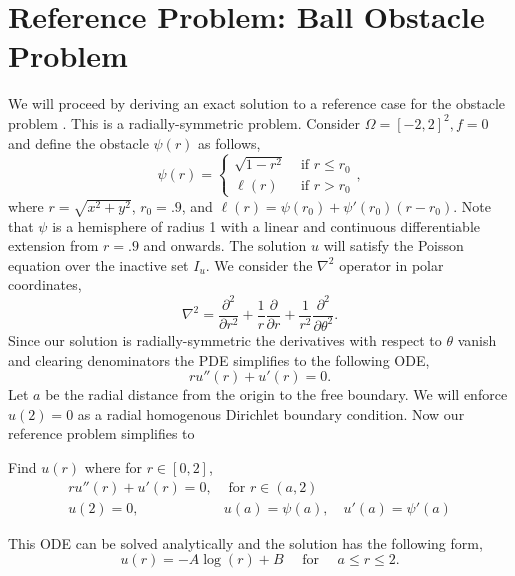 \documentclass[12 pt]{report}
\begin{document}
\section{Reference Problem: Ball Obstacle Problem}
We will proceed by deriving an exact solution to a reference case for the obstacle problem \citep[Chapter 12]{bueler_petsc_2021}. This is a radially-symmetric problem. Consider $\Omega = [-2, 2]^2, f = 0$ and define the obstacle $\psi(r)$ as follows, 
\begin{equation}
  \psi(r) = \begin{cases}
    \sqrt{1 - r^2} & \text{ if } r \leq r_0\\
    \ell(r) & \text{ if } r > r_0
  \end{cases},
\end{equation}
where $r = \sqrt{x^2 + y^2}$, $r_0 = .9$, and $\ell(r) = \psi(r_0) + \psi'(r_0)(r - r_0)$. Note that $\psi$ is a hemisphere of radius 1 with a linear and continuous differentiable extension from $r = .9$ and onwards. The solution $u$ will satisfy the Poisson equation over the inactive set $I_u$. We consider the $\nabla^2$ operator in polar coordinates, 
\begin{equation}
  \nabla^2 = \frac{\partial^2 }{\partial r^2} + \frac{1}{r}\frac{\partial }{\partial r} + \frac{1}{r^2}\frac{\partial^2 }{\partial \theta^2}.
\end{equation}
Since our solution is radially-symmetric the derivatives with respect to $\theta$ vanish and clearing denominators the PDE simplifies to the following ODE, 
\begin{equation}
  ru''(r) + u'(r) = 0.
\end{equation}
Let $a$ be the radial distance from the origin to the free boundary. We will enforce $u(2) = 0$ as a radial homogenous Dirichlet boundary condition. Now our reference problem simplifies to
\begin{mdframed}
  Find $u(r)$ where for $r \in [0, 2]$,
  \begin{align}  \label{eq:Sphere Obstacle}
    ru''(r) + u'(r) = 0, &\text{ for } r \in (a, 2)\\
    u(2) = 0, \quad  &u(a) = \psi(a), \quad u'(a) = \psi'(a)
  \end{align}
\end{mdframed}
This ODE can be solved analytically and the solution has the following form, 
\begin{equation}
  u(r) = -A\log(r) + B \quad \text{ for } \quad a \leq r \leq 2.
\end{equation}
\end{document}
